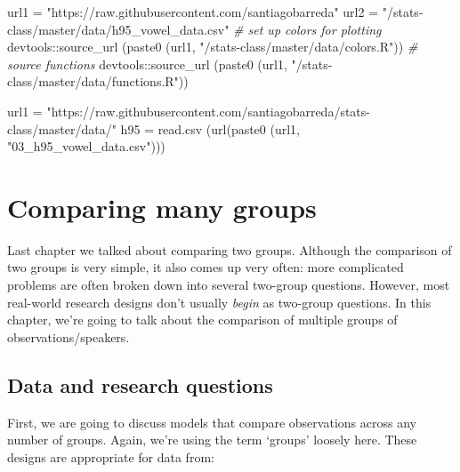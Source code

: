 \documentclass[
]{book}
\newenvironment{Shaded}{\begin{snugshade}}{\end{snugshade}}
\newcommand{\CommentTok}[1]{\textcolor[rgb]{0.56,0.35,0.01}{\textit{#1}}}
\newcommand{\FunctionTok}[1]{\textcolor[rgb]{0.00,0.00,0.00}{#1}}
\newcommand{\NormalTok}[1]{#1}
\newcommand{\OtherTok}[1]{\textcolor[rgb]{0.56,0.35,0.01}{#1}}
\newcommand{\SpecialCharTok}[1]{\textcolor[rgb]{0.00,0.00,0.00}{#1}}
\newcommand{\StringTok}[1]{\textcolor[rgb]{0.31,0.60,0.02}{#1}}
\begin{document}
\begin{Shaded}
\begin{Highlighting}[]
\NormalTok{url1 }\OtherTok{=} \StringTok{"https://raw.githubusercontent.com/santiagobarreda"}
\NormalTok{url2 }\OtherTok{=} \StringTok{"/stats{-}class/master/data/h95\_vowel\_data.csv"}
\CommentTok{\# set up colors for plotting}
\NormalTok{devtools}\SpecialCharTok{::}\FunctionTok{source\_url}\NormalTok{ (}\FunctionTok{paste0}\NormalTok{ (url1, }\StringTok{"/stats{-}class/master/data/colors.R"}\NormalTok{))}
\CommentTok{\# source functions}
\NormalTok{devtools}\SpecialCharTok{::}\FunctionTok{source\_url}\NormalTok{ (}\FunctionTok{paste0}\NormalTok{ (url1, }\StringTok{"/stats{-}class/master/data/functions.R"}\NormalTok{))}

\NormalTok{url1 }\OtherTok{=} \StringTok{"https://raw.githubusercontent.com/santiagobarreda/stats{-}class/master/data/"}
\NormalTok{h95 }\OtherTok{=} \FunctionTok{read.csv}\NormalTok{ (}\FunctionTok{url}\NormalTok{(}\FunctionTok{paste0}\NormalTok{ (url1, }\StringTok{"03\_h95\_vowel\_data.csv"}\NormalTok{)))}
\end{Highlighting}
\end{Shaded}

\hypertarget{comparing-many-groups}{%
\chapter{Comparing many groups}\label{comparing-many-groups}}

Last chapter we talked about comparing two groups. Although the comparison of two groups is very simple, it also comes up very often: more complicated problems are often broken down into several two-group questions. However, most real-world research designs don't usually \emph{begin} as two-group questions. In this chapter, we're going to talk about the comparison of multiple groups of observations/speakers.

\hypertarget{data-and-research-questions-3}{%
\section{Data and research questions}\label{data-and-research-questions-3}}

First, we are going to discuss models that compare observations across any number of groups. Again, we're using the term `groups' loosely here. These designs are appropriate for data from:
\end{document}
